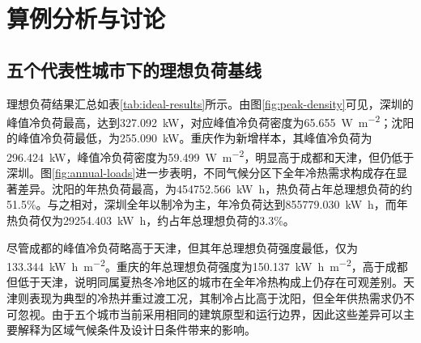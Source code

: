 \section{算例分析与讨论}

\subsection{五个代表性城市下的理想负荷基线}

理想负荷结果汇总如表\ref{tab:ideal-results}所示。由图\ref{fig:peak-density}可见，深圳的峰值冷负荷最高，达到\SI{327.092}{\kilo\watt}，对应峰值冷负荷密度为\SI{65.655}{\watt\per\square\meter}；沈阳的峰值冷负荷最低，为\SI{255.090}{\kilo\watt}。重庆作为新增样本，其峰值冷负荷为\SI{296.424}{\kilo\watt}，峰值冷负荷密度为\SI{59.499}{\watt\per\square\meter}，明显高于成都和天津，但仍低于深圳。图\ref{fig:annual-loads}进一步表明，不同气候分区下全年冷热需求构成存在显著差异。沈阳的年热负荷最高，为\SI{454752.566}{\kilo\watt\hour}，热负荷占年总理想负荷的约51.5\%。与之相对，深圳全年以制冷为主，年冷负荷达到\SI{855779.030}{\kilo\watt\hour}，而年热负荷仅为\SI{29254.403}{\kilo\watt\hour}，约占年总理想负荷的3.3\%。

尽管成都的峰值冷负荷略高于天津，但其年总理想负荷强度最低，仅为\SI{133.344}{\kilo\watt\hour\per\square\meter}。重庆的年总理想负荷强度为\SI{150.137}{\kilo\watt\hour\per\square\meter}，高于成都但低于天津，说明同属夏热冬冷地区的城市在全年冷热构成上仍存在可观差别。天津则表现为典型的冷热并重过渡工况，其制冷占比高于沈阳，但全年供热需求仍不可忽视。由于五个城市当前采用相同的建筑原型和运行边界，因此这些差异可以主要解释为区域气候条件及设计日条件带来的影响。

\begin{table}[tbp]
\centering
\caption{五个城市理想负荷比较结果}
\label{tab:ideal-results}
\footnotesize
{}
\end{table}


